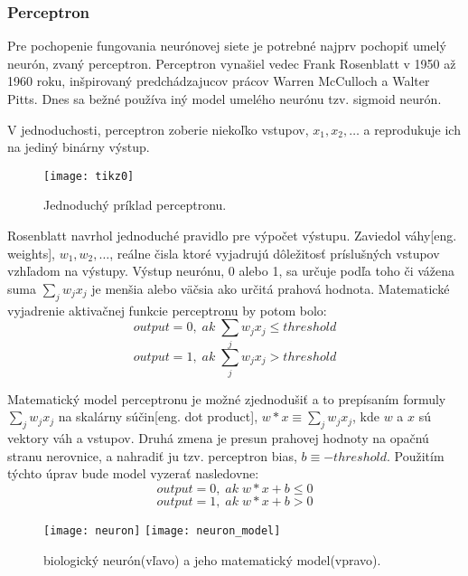 \subsubsection{Perceptron}
Pre pochopenie fungovania neurónovej siete je potrebné najprv pochopiť umelý neurón, zvaný perceptron.
Perceptron vynašiel vedec Frank Rosenblatt v 1950 až 1960 roku, inšpirovaný predchádzajucov prácov Warren McCulloch a Walter Pitts.
Dnes sa bežné používa iný model umelého neurónu tzv. sigmoid neurón\cite{odkaz:HandwrittenDigitRecognision}.

V jednoduchosti, perceptron zoberie niekoľko vstupov, $x_1, x_2, \dots$ a reprodukuje ich na jediný binárny výstup.
\begin{figure}[H]
	\centering
	\texttt{[image: tikz0]}
	\caption{Jednoduchý príklad perceptronu\cite{odkaz:HandwrittenDigitRecognision}.}
	\label{pic:Perceptron}
\end{figure}
Rosenblatt navrhol jednoduché pravidlo pre výpočet výstupu.
Zaviedol váhy[eng. weights], $w_1, w_2, \dots$,
    reálne čisla ktoré vyjadrujú dôležitosť príslušných vstupov vzhľadom na výstupy.
Výstup neurónu, 0 alebo 1, sa určuje podľa toho či vážena suma $\sum_j w_j x_j$ je menšia alebo väčsia ako určitá prahová hodnota.
Matematické vyjadrenie aktivačnej funkcie perceptronu by potom bolo\cite{odkaz:HandwrittenDigitRecognision}:
\begin{equation}
    output = 0, \; ak \; \sum_j w_j x_j \leq threshold
\end{equation}
\begin{equation}
    output = 1, \; ak \; \sum_j w_j x_j > threshold
\end{equation}

Matematický model perceptronu je možné zjednodušiť a to prepísaním formuly $\sum_j w_j x_j$ na skalárny súčin[eng. dot product],
    $w*x \equiv \sum_j w_j x_j$, kde $w$ a $x$ sú vektory váh a vstupov.
Druhá zmena je presun prahovej hodnoty na opačnú stranu nerovnice, a nahradiť ju tzv. perceptron bias, $b \equiv -threshold$.
Použitím týchto úprav bude model vyzerať nasledovne\cite{odkaz:HandwrittenDigitRecognision}:
\begin{equation}
    output = 0, \; ak \; w*x + b \leq 0
\end{equation}
\begin{equation}
    output = 1, \; ak \; w*x + b > 0
\end{equation}

\begin{figure}[H]
    \centering
    \texttt{[image: neuron]}
    \qquad
    \texttt{[image: neuron\_model]}
    \caption{biologický neurón(vľavo) a jeho matematický model(vpravo)\cite{odkaz:ConvolutionalNeuralNetworkCS231n}.}
    \label{pic:Neuron}
\end{figure}

